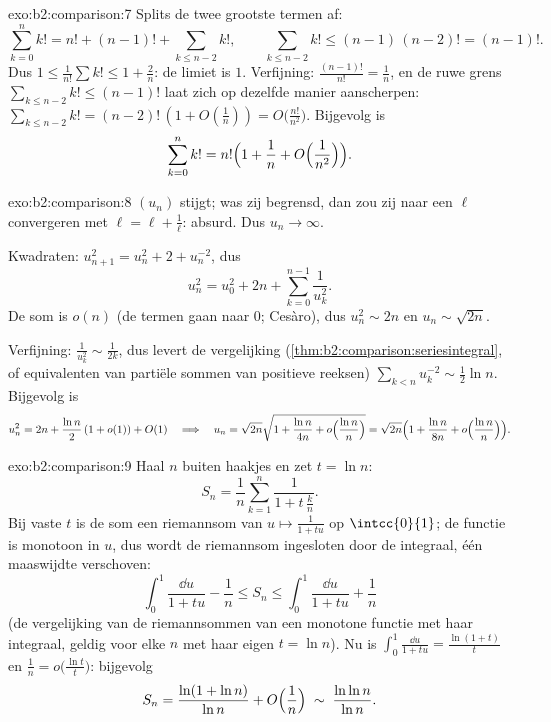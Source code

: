 \begin{solution}{exo:b2:comparison:7}
Splits de twee grootste termen af:
\[
\sum_{k=0}^{n} k! = n! + (n-1)! + \sum_{k \leq n-2} k! ,
\qquad
\sum_{k\leq n-2} k! \leq (n-1)\,(n-2)! = (n-1)! .
\]
Dus $1 \leq \frac{1}{n!}\sum k! \leq 1 + \frac{2}{n}$: de limiet is
$1$. Verfijning: $\frac{(n-1)!}{n!} = \frac1n$, en de ruwe grens
$\sum_{k \leq n-2}k! \leq (n-1)!$ laat zich op dezelfde manier
aanscherpen: $\sum_{k\leq n-2} k! = (n-2)!\,(1 + O(\frac1n)) =
O\bigl(\frac{n!}{n^2}\bigr)$. Bijgevolg is
\[
\sum_{k=0}^{n} k! = n!\Bigl(1 + \frac1n + O\Bigl(\frac{1}{n^2}\Bigr)\Bigr).
\]
\end{solution}

\begin{solution}{exo:b2:comparison:8}
$(u_n)$ stijgt; was zij begrensd, dan zou zij naar een $\ell$
convergeren met $\ell = \ell + \frac1\ell$: absurd. Dus $u_n \to
\infty$.

Kwadraten: $u_{n+1}^2 = u_n^2 + 2 + u_n^{-2}$, dus
\[
u_n^2 = u_0^2 + 2n + \sum_{k=0}^{n-1} \frac{1}{u_k^2} .
\]
De som is $o(n)$ (de termen gaan naar $0$; Cesàro), dus $u_n^2 \sim
2n$ en $u_n \sim \sqrt{2n}$.

Verfijning: $\frac{1}{u_k^2} \sim \frac{1}{2k}$, dus levert de
vergelijking (\cref{thm:b2:comparison:seriesintegral}, of
equivalenten van partiële sommen van positieve reeksen)
$\sum_{k<n} u_k^{-2} \sim \frac12 \ln n$. Bijgevolg is
\[
u_n^2 = 2n + \frac{\ln n}{2}\,(1 + o(1)) + O(1)
\quad\Longrightarrow\quad
u_n = \sqrt{2n}\sqrt{1 + \frac{\ln n}{4n} + o\Bigl(\frac{\ln
n}{n}\Bigr)}
= \sqrt{2n}\Bigl(1 + \frac{\ln n}{8n} + o\Bigl(\frac{\ln
n}{n}\Bigr)\Bigr).
\]
\end{solution}

\begin{solution}{exo:b2:comparison:9}
Haal $n$ buiten haakjes en zet $t = \ln n$:
\[
S_n = \frac1n \sum_{k=1}^{n} \frac{1}{1 + t\,\frac kn} .
\]
Bij vaste $t$ is de som een riemannsom van $u \mapsto \frac{1}{1 +
tu}$ op $\intcc{0}{1}$; de functie is monotoon in $u$, dus wordt de
riemannsom ingesloten door de integraal, één maaswijdte verschoven:
\[
\int_0^1 \frac{\dd u}{1 + tu} - \frac1n
\leq S_n \leq \int_0^1 \frac{\dd u}{1 + tu} + \frac1n
\]
(de vergelijking van de riemannsommen van een monotone functie met
haar integraal, geldig voor elke $n$ met haar eigen $t = \ln n$).
Nu is $\int_0^1 \frac{\dd u}{1 + tu} = \frac{\ln(1 + t)}{t}$ en
$\frac1n = o\bigl(\frac{\ln t}{t}\bigr)$: bijgevolg
\[
S_n = \frac{\ln(1 + \ln n)}{\ln n} + O\Bigl(\frac 1n\Bigr)
\;\sim\; \frac{\ln\ln n}{\ln n} .
\]
\end{solution}

